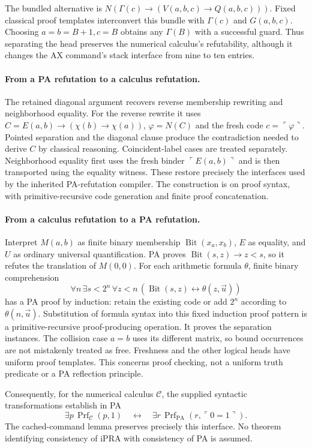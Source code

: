 \documentclass[11pt,letterpaper]{article}
\newcommand{\PA}{\mathrm{PA}}\newcommand{\Con}{\operatorname{Con}}
\newcommand{\Prf}{\operatorname{Prf}}\newcommand{\Halt}{\operatorname{Halt}}
\begin{document}
The bundled alternative is
$N(\Gamma(c)\to(V(a,b,c)\to Q(a,b,c)))$. Fixed classical proof templates
interconvert this bundle with $\Gamma(c)$ and $G(a,b,c)$. Choosing
$a=b=B+1,c=B$ obtains any $\Gamma(B)$ with a successful guard. Thus separating
the head preserves the numerical calculus's refutability, although it changes
the AX command's stack interface from nine to ten entries.

\paragraph{From a PA refutation to a calculus refutation.}
The retained diagonal argument recovers reverse membership rewriting and
neighborhood equality. For the reverse rewrite it uses
$C=E(a,b)\to(\chi(b)\to\chi(a))$, $\varphi=N(C)$ and the fresh code
$c=\ulcorner\varphi\urcorner$. Pointed separation and the diagonal clause
produce the contradiction needed to derive $C$ by classical reasoning.
Coincident-label cases are treated separately. Neighborhood equality first
uses the fresh binder $\ulcorner E(a,b)\urcorner$ and is then transported
using the equality witness. These restore precisely the interfaces used by
the inherited PA-refutation compiler. The construction is on proof syntax,
with primitive-recursive code generation and finite proof concatenation.

\paragraph{From a calculus refutation to a PA refutation.}
Interpret $M(a,b)$ as finite binary membership $\operatorname{Bit}(x_a,x_b)$,
$E$ as equality, and $U$ as ordinary universal quantification. PA proves
$\operatorname{Bit}(s,z)\to z<s$, so it refutes the translation of $M(0,0)$.
For each arithmetic formula $\theta$, finite binary comprehension
\[
 \forall n\,\exists s<2^n\,\forall z<n\,
   (\operatorname{Bit}(s,z)\leftrightarrow\theta(z,\vec u))
\]
has a PA proof by induction: retain the existing code or add $2^n$ according
to $\theta(n,\vec u)$. Substitution of formula syntax into this fixed induction
proof pattern is a primitive-recursive proof-producing operation. It proves
the separation instances. The collision case $a=b$ uses its different matrix,
so bound occurrences are not mistakenly treated as free. Freshness and the
other logical heads have uniform proof templates. This concerns proof checking,
not a uniform truth predicate or a PA reflection principle.

Consequently, for the numerical calculus $\mathcal C$, the supplied syntactic
transformations establish in PA
\[
 \exists p\,\Prf_{\mathcal C}(p,1)
 \quad\longleftrightarrow\quad
 \exists r\,\Prf_{\PA}(r,\ulcorner0=1\urcorner).
\]
The cached-command lemma preserves precisely this interface. No theorem
identifying consistency of iPRA with consistency of PA is assumed.
\end{document}
